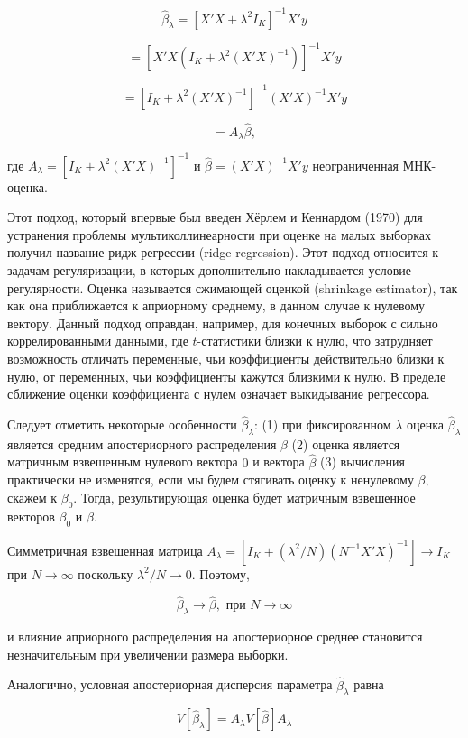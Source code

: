 \begin{equation}
\hat{\beta}_{\lambda}=[X'X+\lambda^{2}I_{K}]^{-1}X'y
\end{equation}

\[
=[X'X(I_{K}+\lambda^{2}(X'X)^{-1})]^{-1}X'y
\]

\[
=[I_{K}+\lambda^{2}(X'X)^{-1}]^{-1}(X'X)^{-1}X'y
\]

\[
=A_{\lambda}\hat{\beta},
\]

где $A_{\lambda}=[I_{K}+\lambda^{2}(X'X)^{-1}]^{-1}$ и $\hat{\beta}=(X'X)^{-1}X'y$ неограниченная МНК-оценка.

Этот подход, который впервые был введен Хёрлем и Кеннардом (1970) для устранения проблемы мультиколлинеарности при оценке на малых выборках получил название ридж-регрессии (ridge regression). Этот подход относится к задачам регуляризации, в которых дополнительно накладывается условие регулярности. Оценка называется сжимающей оценкой (shrinkage estimator), так как она приближается к априорному среднему, в данном случае к нулевому вектору. Данный подход оправдан, например, для конечных выборок с сильно коррелированными данными, где $t$-статистики близки к нулю, что затрудняет возможность отличать переменные, чьи коэффициенты действительно близки к нулю, от переменных, чьи коэффициенты кажутся близкими к нулю. В пределе сближение оценки коэффициента с нулем означает выкидывание регрессора.

Следует отметить некоторые особенности $\hat{\beta}_{\lambda}$: (1) при фиксированном $\lambda$ оценка $\hat{\beta}_{\lambda}$ является средним апостериорного распределения $\beta$ (2) оценка является матричным взвешенным нулевого вектора $0$ и вектора $\hat{\beta}$ (3) вычисления практически не изменятся, если мы будем стягивать оценку к ненулевому $\beta$, скажем к $\beta_0$. Тогда, результирующая оценка будет матричным взвешенное векторов $\beta_0$ и $\hat{\beta}$.

Симметричная взвешенная матрица $A_{\lambda}=[I_{K}+(\lambda^{2}/N)(N^{-1}X'X)^{-1}]\rightarrow{I_K}$ при $N\rightarrow{\infty}$ поскольку $\lambda^{2}/N{\rightarrow}0$. Поэтому,

\[
\hat{\beta}_{\lambda}{\rightarrow}\hat{\beta}, \text{ при } N\rightarrow\infty
\]

и влияние  априорного распределения на апостериорное среднее становится незначительным при увеличении размера выборки.

Аналогично, условная апостериорная дисперсия параметра $\hat{\beta}_\lambda$ равна

\[
V[\hat{\beta}_{\lambda}]=A_{\lambda}V[\hat{\beta}]A_{\lambda}
\]

